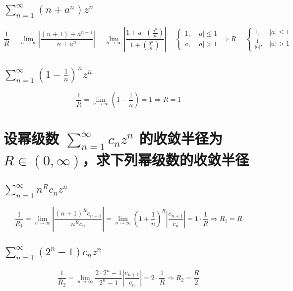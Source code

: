 \documentclass[UTF8]{report}
\theoremstyle{MyLineTheoremStyle} %
\theoremstyle{MyBlockTheoremStyle} %
\theoremstyle{MySubsubsectionStyle} %
\begin{document}
\subsection{$\sum_{n=1}^{\infty} (n + a^n) z^n$}
\noindent
\begin{equation}
\frac{1}{R} 
= \lim_{n \to \infty} \left| \frac{(n+1) + a^{n+1}}{n + a^n} \right| 
= \lim_{n \to \infty} \left|\frac{1 + a\cdot \left(\frac{a^n}{n}\right)}{1 + \left(\frac{a^n}{n}\right)} \right| 
= \begin{cases}
    1, & | a | \leqslant 1 \\
    a, & | a | > 1
\end{cases}\Longrightarrow 
R =
\begin{cases}
    1, & | a | \leqslant 1 \\
    \frac{1}{|a|}, & | a | > 1
\end{cases}
\end{equation}

\subsection{$\sum_{n=1}^{\infty} (1 - \frac{1}{n})^n z^n$}
\noindent
\begin{equation}
\frac{1}{R} = \overline{\lim_{n \to \infty}} \left(1 - \frac{1}{n}\right) = 1 \Longrightarrow R = 1
\end{equation}

\section{设幂级数 $\sum_{n=1}^{\infty} c_n z^n$ 的收敛半径为 $R \in (0,\infty)$，求下列幂级数的收敛半径}

\subsection{$\sum_{n=1}^{\infty} n^Rc_n z^n$}
\noindent
\begin{equation}
\frac{1}{R_1} 
= \lim_{n \to \infty} \left| \frac{(n+1)^R c_{n+1}}{n^R c_n} \right|
= \lim_{n \to \infty} \left(1 + \frac{1}{n}\right)^R \left| \frac{c_{n+1}}{c_n} \right|
= 1 \cdot \frac{1}{R} \Longrightarrow R_1 = R
\end{equation}

\subsection{$\sum_{n=1}^{\infty} (2^n - 1)c_n z^n$}
\noindent
\begin{equation}
\frac{1}{R_2} 
= \lim_{n \to \infty} \frac{2\cdot 2^n - 1}{2^n - 1} \left| \frac{c_{n+1}}{c_n} \right|
= 2\cdot \frac{1}{R} \Longrightarrow R_2 = \frac{R}{2}
\end{equation}
\end{document}
